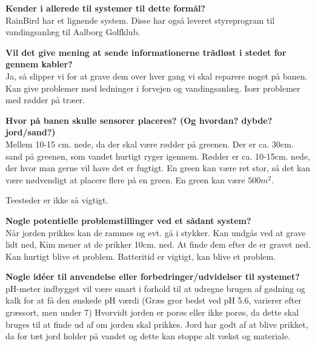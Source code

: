 \textbf{Kender i allerede til systemer til dette formål?}\\
RainBird har et lignende system. Disse har også leveret styreprogram til vandingsanlæg til Aalborg Golfklub.

\textbf{Vil det give mening at sende informationerne trådløst i stedet for gennem kabler?}\\
Ja, så slipper vi for at grave dem over hver gang vi skal reparere noget på banen. Kan give problemer med ledninger i forvejen og vandingsanlæg. Især problemer med rødder på træer.

\textbf{Hvor på banen skulle sensorer placeres? (Og hvordan? dybde? jord/sand?)}\\
Mellem 10-15 cm. nede, da der skal være rødder på greenen. Der er ca. 30cm. sand på greenen, som vandet hurtigt ryger igennem. Rødder er ca. 10-15cm. nede, der hvor man gerne vil have det er fugtigt.
En green kan være ret stor, så det kan være nødvendigt at placere flere på en green. En green kan være $500m^2$.

Teesteder er ikke så vigtigt.

\textbf{Nogle potentielle problemstillinger ved et sådant system?}\\
Når jorden prikkes kan de rammes og evt. gå i stykker. Kan undgås ved at grave lidt ned, Kim mener at de prikker 10cm. ned. 
At finde dem efter de er gravet ned. Kan hurtigt blive et problem. Batteritid er vigtigt, kan blive et problem.

\textbf{Nogle idéer til anvendelse eller forbedringer/udvidelser til systemet?}\\
pH-meter indbygget vil være smart i forhold til at udregne brugen af gødning og kalk for at få den ønskede pH værdi (Græs gror bedst ved pH 5.6, varierer efter græssort, men under 7)
Hvorvidt jorden er porøs eller ikke porøs, da dette skal bruges til at finde ud af om jorden skal prikkes.
Jord har godt af at blive prikket, da for tæt jord holder på vandet og dette kan stoppe alt vækst og materiale.
